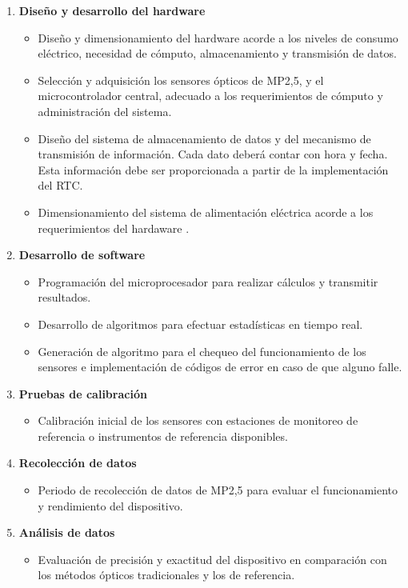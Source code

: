\begin{enumerate}[label=\alph*)]
	\item \textbf{Diseño y desarrollo del hardware}
	\begin{itemize}
		\item Diseño y dimensionamiento del hardware acorde a los niveles de consumo eléctrico, necesidad de cómputo, almacenamiento y transmisión de datos.
		\item Selección y adquisición los sensores ópticos de MP2,5, y el microcontrolador central, adecuado a los requerimientos de cómputo y administración del sistema.
		\item Diseño del sistema de almacenamiento de datos y del mecanismo de transmisión de información. Cada dato deberá contar con hora y fecha. Esta información debe ser proporcionada a partir de la implementación del RTC.
		\item Dimensionamiento del sistema de alimentación eléctrica acorde a los requerimientos del hardaware .
	\end{itemize}

	\item \textbf{Desarrollo de software}
	\begin{itemize}
		\item Programación del microprocesador para realizar cálculos y transmitir resultados.
		\item Desarrollo de algoritmos para efectuar estadísticas en tiempo real.
		\item Generación de algoritmo para el chequeo del funcionamiento de los sensores e implementación de códigos de error en caso de que alguno falle.
	\end{itemize}

	\item \textbf{Pruebas de calibración}
	\begin{itemize}
		\item Calibración inicial de los sensores con estaciones de monitoreo de referencia o instrumentos de referencia disponibles.
	\end{itemize}

	\item \textbf{Recolección de datos}
	\begin{itemize}
		\item Periodo de recolección de datos de MP2,5 para evaluar el funcionamiento y rendimiento del dispositivo.
	\end{itemize}

	\item \textbf{Análisis de datos}
	\begin{itemize}
		\item Evaluación de precisión y exactitud del dispositivo en comparación con los métodos ópticos tradicionales y los de referencia.
	\end{itemize}


\end{enumerate}
